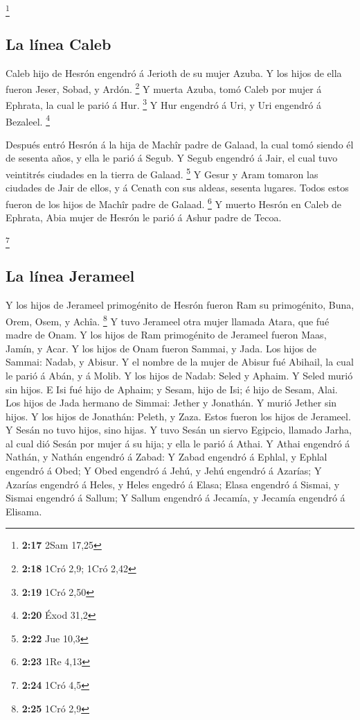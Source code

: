 \footnote{\textbf{2:17} 2Sam 17,25}

\hypertarget{la-luxednea-caleb}{%
\subsection{La línea Caleb}\label{la-luxednea-caleb}}

 Caleb hijo de Hesrón engendró á Jerioth de su mujer Azuba.
Y los hijos de ella fueron Jeser, Sobad, y Ardón. \footnote{\textbf{2:18}
  1Cró 2,9; 1Cró 2,42}  Y muerta Azuba, tomó Caleb por
mujer á Ephrata, la cual le parió á Hur. \footnote{\textbf{2:19} 1Cró
  2,50}  Y Hur engendró á Uri, y Uri engendró á Bezaleel.
\footnote{\textbf{2:20} Éxod 31,2}

 Después entró Hesrón á la hija de Machîr padre de Galaad,
la cual tomó siendo él de sesenta años, y ella le parió á Segub.
 Y Segub engendró á Jair, el cual tuvo veintitrés ciudades
en la tierra de Galaad. \footnote{\textbf{2:22} Jue 10,3} 
Y Gesur y Aram tomaron las ciudades de Jair de ellos, y á Cenath con sus
aldeas, sesenta lugares. Todos estos fueron de los hijos de Machîr padre
de Galaad. \footnote{\textbf{2:23} 1Re 4,13}  Y muerto
Hesrón en Caleb de Ephrata, Abia mujer de Hesrón le parió á Ashur padre
de Tecoa.

\footnote{\textbf{2:24} 1Cró 4,5}

\hypertarget{la-luxednea-jerameel}{%
\subsection{La línea Jerameel}\label{la-luxednea-jerameel}}

 Y los hijos de Jerameel primogénito de Hesrón fueron Ram
su primogénito, Buna, Orem, Osem, y Achîa. \footnote{\textbf{2:25} 1Cró
  2,9}  Y tuvo Jerameel otra mujer llamada Atara, que fué
madre de Onam.  Y los hijos de Ram primogénito de Jerameel
fueron Maas, Jamín, y Acar.  Y los hijos de Onam fueron
Sammai, y Jada. Los hijos de Sammai: Nadab, y Abisur.  Y el
nombre de la mujer de Abisur fué Abihail, la cual le parió á Abán, y á
Molib.  Y los hijos de Nadab: Seled y Aphaim. Y Seled murió
sin hijos.  E Isi fué hijo de Aphaim; y Sesam, hijo de Isi;
é hijo de Sesam, Alai.  Los hijos de Jada hermano de
Simmai: Jether y Jonathán. Y murió Jether sin hijos.  Y los
hijos de Jonathán: Peleth, y Zaza. Estos fueron los hijos de Jerameel.
 Y Sesán no tuvo hijos, sino hijas.  Y tuvo
Sesán un siervo Egipcio, llamado Jarha, al cual dió Sesán por mujer á su
hija; y ella le parió á Athai.  Y Athai engendró á Nathán,
y Nathán engendró á Zabad:  Y Zabad engendró á Ephlal, y
Ephlal engendró á Obed;  Y Obed engendró á Jehú, y Jehú
engendró á Azarías;  Y Azarías engendró á Heles, y Heles
engedró á Elasa;  Elasa engendró á Sismai, y Sismai
engendró á Sallum;  Y Sallum engendró á Jecamía, y Jecamía
engendró á Elisama.

